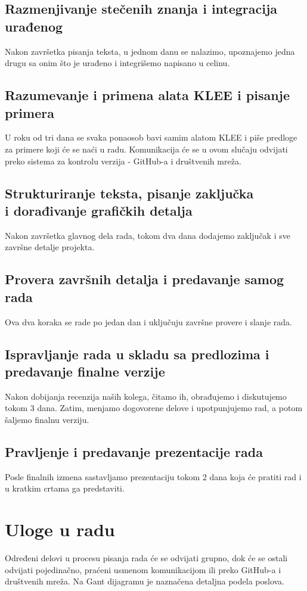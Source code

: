 \documentclass{article}
\begin{document}
	\subsection{Razmenjivanje stečenih znanja i integracija urađenog}
		Nakon završetka pisanja teksta, u jednom danu se nalazimo, upoznajemo jedna drugu sa onim što je urađeno i integrišemo napisano u celinu.
	
	\subsection{Razumevanje i primena alata KLEE i pisanje primera}
		U roku od tri dana se svaka ponaosob bavi samim alatom KLEE i piše predloge za primere koji će se naći u radu. Komunikacija će se u ovom slučaju odvijati preko sistema za kontrolu verzija - GitHub-a i društvenih mreža.
			
	\subsection{Strukturiranje teksta, pisanje zaključka \\ i dorađivanje grafičkih detalja}
		Nakon završetka glavnog dela rada, tokom dva dana dodajemo zaključak i sve završne detalje projekta. 
		
	\subsection{Provera završnih detalja i predavanje samog rada}
		Ova dva koraka se rade po jedan dan i uključuju završne provere i slanje rada.		
		
	\subsection{Ispravljanje rada u skladu sa predlozima i predavanje finalne verzije}
		Nakon dobijanja recenzija naših kolega, čitamo ih, obrađujemo i diskutujemo tokom 3 dana. Zatim, menjamo dogovorene delove i upotpunjujemo rad, a potom šaljemo finalnu verziju. 
		
	\subsection{Pravljenje i predavanje prezentacije rada}
		Posle finalnih izmena sastavljamo prezentaciju tokom 2 dana koja će pratiti rad i u kratkim crtama ga predstaviti. 
		
	
	
	\section{Uloge u radu}	
		Određeni delovi u procesu pisanja rada će se odvijati grupno, dok će se ostali odvijati pojedinačno, praćeni usmenom komunikacijom ili preko GitHub-a i društvenih mreža.
		Na Gant dijagramu je naznačena detaljna podela poslova.
				  	
\end{document}
